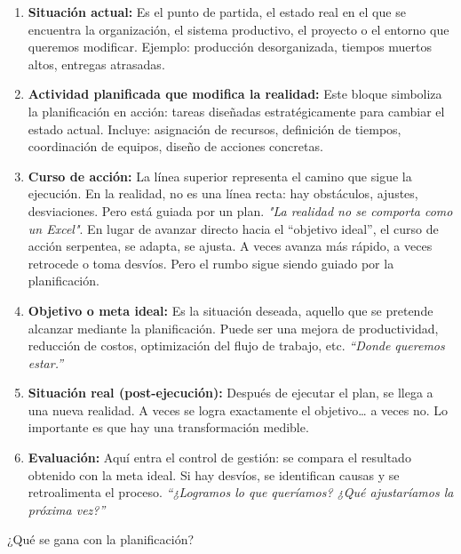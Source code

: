 \documentclass[a4paper,oneside,11pt]{article}
\begin{document}
\begin{enumerate}
    \item \textbf{Situación actual:} Es el punto de partida, el estado real en el que se encuentra la organización, el sistema productivo, el proyecto o el entorno que queremos modificar. Ejemplo: producción desorganizada, tiempos muertos altos, entregas atrasadas.

    \item \textbf{Actividad planificada que modifica la realidad:} Este bloque simboliza la planificación en acción: tareas diseñadas estratégicamente para cambiar el estado actual. Incluye: asignación de recursos, definición de tiempos, coordinación de equipos, diseño de acciones concretas.

    \item \textbf{Curso de acción:} La línea superior representa el camino que sigue la ejecución. En la realidad, no es una línea recta: hay obstáculos, ajustes, desviaciones. Pero está guiada por un plan. \textit{"La realidad no se comporta como un Excel"}. En lugar de avanzar directo hacia el “objetivo ideal”, el curso de acción serpentea, se adapta, se ajusta. A veces avanza más rápido, a veces retrocede o toma desvíos. Pero el rumbo sigue siendo guiado por la planificación.

    \item \textbf{Objetivo o meta ideal:} Es la situación deseada, aquello que se pretende alcanzar mediante la planificación. Puede ser una mejora de productividad, reducción de costos, optimización del flujo de trabajo, etc. \textit{“Donde queremos estar.”}

    \item \textbf{Situación real (post-ejecución):} Después de ejecutar el plan, se llega a una nueva realidad. A veces se logra exactamente el objetivo… a veces no. Lo importante es que hay una transformación medible.

    \item \textbf{Evaluación:} Aquí entra el control de gestión: se compara el resultado obtenido con la meta ideal. Si hay desvíos, se identifican causas y se retroalimenta el proceso.\textit{ “¿Logramos lo que queríamos? ¿Qué ajustaríamos la próxima vez?”}
\end{enumerate}

¿Qué se gana con la planificación?
\end{document}
